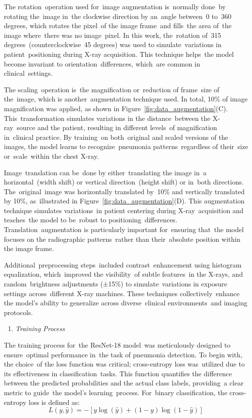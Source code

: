 \documentclass[
  twocolumn,
  10pt,
  a4paper,
  journal
]{IEEEtran}
\begin{document}
The rotation~operation used for~image augmentation is~normally done~by
rotating the~image in~the clockwise direction by an~angle between~0
to~360 degrees, which rotates the pixel~of the image frame~and fills~the
area of~the image where~there was no image~pixel. In this work,
the~rotation of~315 degrees~(counterclockwise~45 degrees) was used to
simulate~variations in patient~positioning during X-ray acquisition.
This technique helps~the model become invariant to
orientation~differences, which~are common in clinical~settings.

The scaling~operation is~the magnification or~reduction of frame~size of
the~image, which is another~augmentation technique used. In total, 10\%
of image magnification was applied, as shown in Figure~\ref{fig:data_augmentation}(C).
This~transformation simulates variations in the distance~between the
X-ray~source and the patient, resulting in different levels~of
magnification in~clinical practice. By training~on both~original and
scaled versions of the images, the model learns to recognize~pneumonia
patterns~regardless of their~size or~scale~within the chest X-ray.

Image~translation can be~done by either~translating the image in~a
horizontal~(width shift) or vertical direction~(height shift) or in~both
directions. The~original~image was horizontally translated by~10\% and
vertically translated by 10\%, as~illustrated in Figure~\ref{fig:data_augmentation}(D). This
augmentation technique simulates variations~in patient centering during
X-ray~acquisition and teaches~the model to be~robust to
positioning~differences. Translation~augmentation is particularly
important for~ensuring that~the model focuses on the radiographic
patterns~rather than their~absolute position within the image frame.

Additional~preprocessing steps~included contrast~enhancement using
histogram equalization, which~improved the visibility~of subtle
features~in the X-rays, and random~brightness adjustments (±15\%) to
simulate~variations in exposure settings across~different X-ray
machines. These techniques collectively~enhance the
model's ability to generalize across diverse~clinical
environments~and imaging protocols.

\begin{enumerate}
\def\labelenumi{\Alph{enumi}.}
\setcounter{enumi}{4}
\item
  \emph{Training Process}
\end{enumerate}

The training process for~the ResNet-18 model~was meticulously designed
to ensure~optimal performance in~the task of pneumonia detection. To
begin with, the choice~of the loss function was critical; cross-entropy
loss was~utilized due to its effectiveness in classification~tasks. This
function quantifies the difference between the predicted probabilities
and the actual class labels, providing~a clear metric to guide~the
model's learning~process. For~binary classification, the
cross-entropy loss is defined as:
\begin{equation}
L(y, \hat{y}) = -[y \log(\hat{y}) + (1-y)\log(1-\hat{y})]
\end{equation}
\end{document}
